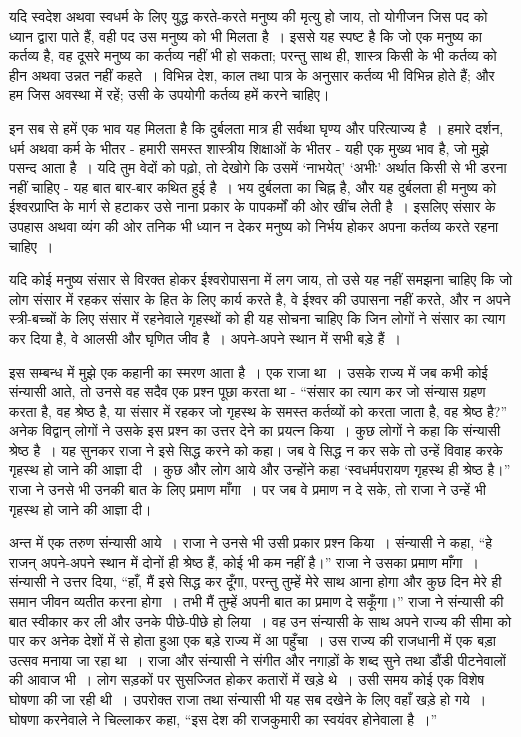 यदि स्वदेश अथवा स्वधर्म के लिए युद्ध करते-करते मनुष्य की मृत्यु हो जाय, तो योगीजन जिस पद को ध्यान द्वारा पाते हैं, वही पद उस मनुष्य को भी मिलता है~। इससे यह स्पष्ट है कि जो एक मनुष्य का कर्तव्य है, वह दूसरे मनुष्य का कर्तव्य नहीं भी हो सकता; परन्तु साथ ही, शास्त्र किसी के भी कर्तव्य को हीन अथवा उन्नत नहीं कहते~। विभिन्न देश, काल तथा पात्र के अनुसार कर्तव्य भी विभिन्न होते हैं; और हम जिस अवस्था में रहें; उसी के उपयोगी कर्तव्य हमें करने चाहिए।

इन सब से हमें एक भाव यह मिलता है कि दुर्बलता मात्र ही सर्वथा घृण्य और परित्याज्य है~। हमारे दर्शन, धर्म अथवा कर्म के भीतर - हमारी समस्त शास्त्रीय शिक्षाओं के भीतर - यही एक मुख्य भाव है, जो मुझे पसन्द आता है~। यदि तुम वेदों को पढ़ो, तो देखोगे कि उसमें ‘नाभयेत्’ ‘अभीः’ अर्थात किसी से भी डरना नहीं चाहिए - यह बात बार-बार कथित हुई है~। भय दुर्बलता का चिह्न है, और यह दुर्बलता ही मनुष्य को ईश्वरप्राप्ति के मार्ग से हटाकर उसे नाना प्रकार के पापकर्मों की ओर खींच लेती है~। इसलिए संसार के उपहास अथवा व्यंग की ओर तनिक भी ध्यान न देकर मनुष्य को निर्भय होकर अपना कर्तव्य करते रहना चाहिए~।

यदि कोई मनुष्य संसार से विरक्त होकर ईश्वरोपासना में लग जाय, तो उसे यह नहीं समझना चाहिए कि जो लोग संसार में रहकर संसार के हित के लिए कार्य करते है, वे ईश्वर की उपासना नहीं करते, और न अपने स्त्री-बच्चों के लिए संसार में रहनेवाले गृहस्थों को ही यह सोचना चाहिए कि जिन लोगों ने संसार का त्याग कर दिया है, वे आलसी और घृणित जीव है~। अपने-अपने स्थान में सभी बड़े हैं~।

इस सम्बन्ध में मुझे एक कहानी का स्मरण आता है~। एक राजा था~। उसके राज्य में जब कभी कोई संन्यासी आते, तो उनसे वह सदैव एक प्रश्न पूछा करता था - “संसार का त्याग कर जो संन्यास ग्रहण करता है, वह श्रेष्ठ है, या संसार में रहकर जो गृहस्थ के समस्त कर्तव्यों को करता जाता है, वह श्रेष्ठ है?” अनेक विद्वान् लोगों ने उसके इस प्रश्न का उत्तर देने का प्रयत्न किया~। कुछ लोगों ने कहा कि संन्यासी श्रेष्ठ है~। यह सुनकर राजा ने इसे सिद्ध करने को कहा। जब वे सिद्ध न कर सके तो उन्हें विवाह करके गृहस्थ हो जाने की आज्ञा दी~। कुछ और लोग आये और उन्होंने कहा ‘स्वधर्मपरायण गृहस्थ ही श्रेष्ठ है।” राजा ने उनसे भी उनकी बात के लिए प्रमाण माँगा~। पर जब वे प्रमाण न दे सके, तो राजा ने उन्हें भी गृहस्थ हो जाने की आज्ञा दी।

अन्त में एक तरुण संन्यासी आये~। राजा ने उनसे भी उसी प्रकार प्रश्न किया~। संन्यासी ने कहा, “हे राजन् अपने-अपने स्थान में दोनों ही श्रेष्ठ हैं, कोई भी कम नहीं है।” राजा ने उसका प्रमाण माँगा~। संन्यासी ने उत्तर दिया, “हाँ, मैं इसे सिद्ध कर दूँगा, परन्तु तुम्हें मेरे साथ आना होगा और कुछ दिन मेरे ही समान जीवन व्यतीत करना होगा~। तभी मैं तुम्हें अपनी बात का प्रमाण दे सकूँगा।” राजा ने संन्यासी की बात स्वीकार कर ली और उनके पीछे-पीछे हो लिया~। वह उन संन्यासी के साथ अपने राज्य की सीमा को पार कर अनेक देशों में से होता हुआ एक बड़े राज्य में आ पहुँचा~। उस राज्य की राजधानी में एक बड़ा उत्सव मनाया जा रहा था~। राजा और संन्यासी ने संगीत और नगाड़ों के शब्द सुने तथा डौंडी पीटनेवालों की आवाज भी~। लोग सड़कों पर सुसज्जित होकर कतारों में खड़े थे~। उसी समय कोई एक विशेष घोषणा की जा रही थी~। उपरोक्त राजा तथा संन्यासी भी यह सब दखेने के लिए वहाँ खड़े हो गये~। घोषणा करनेवाले ने चिल्लाकर कहा, “इस देश की राजकुमारी का स्वयंवर होनेवाला है~।”

